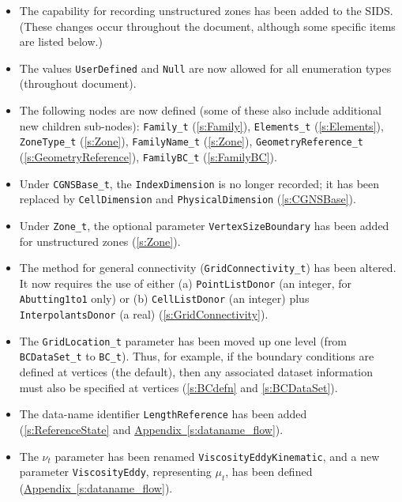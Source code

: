 \begin{itemize}
\item The capability for recording unstructured zones has been 
      added to the SIDS.
      (These changes occur throughout the document, although some
      specific items are listed below.)
\item The values \texttt{UserDefined} and \texttt{Null} are now allowed for
      all enumeration types (throughout document).
\item The following nodes are now defined (some of these also
      include additional new children sub-nodes): \texttt{Family\_t}
      (\autoref{s:Family}), \texttt{Elements\_t} (\autoref{s:Elements}),
      \texttt{ZoneType\_t} (\autoref{s:Zone}), \texttt{FamilyName\_t}
      (\autoref{s:Zone}), \texttt{GeometryReference\_t}
      (\autoref{s:GeometryReference}), \texttt{FamilyBC\_t}
      (\autoref{s:FamilyBC}).
\item Under \texttt{CGNSBase\_t}, the \texttt{IndexDimension} is no longer
      recorded; it has been replaced by \texttt{CellDimension} and
      \texttt{PhysicalDimension} (\autoref{s:CGNSBase}).
\item Under \texttt{Zone\_t}, the optional parameter
      \texttt{VertexSizeBoundary} has been added for unstructured zones
      (\autoref{s:Zone}).
\item The method for general connectivity (\texttt{GridConnectivity\_t}) 
      has been altered.
      It now requires the use of either (a) \texttt{PointListDonor} (an
      integer, for \texttt{Abutting1to1} only) or (b) \texttt{CellListDonor}
      (an integer) plus \texttt{InterpolantsDonor} (a real)
      (\autoref{s:GridConnectivity}).
\item The \texttt{GridLocation\_t} parameter has been moved up one level
      (from \texttt{BCDataSet\_t} to \texttt{BC\_t}).
      Thus, for example, if the boundary conditions are defined at
      vertices (the default), then any associated dataset information
      must also be specified at vertices (\autoref{s:BCdefn} and
      \autoref{s:BCDataSet}).
\item The data-name identifier \texttt{LengthReference}
      has been added (\autoref{s:ReferenceState} and
      \hyperref[s:dataname_flow]{Appendix~\ref*{s:dataname_flow}}).
\item The $\nu_t$ parameter has been renamed
      \texttt{ViscosityEddyKinematic}, and a new parameter
      \texttt{ViscosityEddy}, representing $\mu_t$, has been defined
      (\hyperref[s:dataname_flow]{Appendix~\ref*{s:dataname_flow}}).
\end{itemize}

